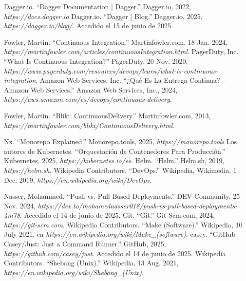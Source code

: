 
\begin{thebibliography}{99}
 Dagger.io. ``Dagger Documentation | Dagger.'' Dagger.io, 2022, {\it https://docs.dagger.io}
 Dagger.io. “Dagger | Blog.” Dagger.io, 2025, {\it https://dagger.io/blog/}. Accedido el 15 de junio de 2025

 Fowler, Martin. ``Continuous Integration.'' Martinfowler.com, 18 Jan. 2024, {\it https://martinfowler.com/articles/continuousIntegration.html}.
 PagerDuty, Inc. ``What Is Continuous Integration?'' PagerDuty, 20 Nov. 2020, {\it https://www.pagerduty.com/resources/devops/learn/what-is-continuous-integration}.
 Amazon Web Services, Inc. ``¿Qué Es La Entrega Continua? – Amazon Web Services.'' Amazon Web Services, Inc., 2024, {\it https://aws.amazon.com/es/devops/continuous-delivery}.

 Fowler, Martin. ``Bliki: ContinuousDelivery.'' Martinfowler.com, 2013, {\it https://martinfowler.com/bliki/ContinuousDelivery.html}.

 Nx. ``Monorepo Explained.'' Monorepo.tools, 2025, {\it https://monorepo.tools}
 Los autores de Kubernetes. ``Orquestación de Contenedores Para Producción.'' Kubernetes, 2025, {\it https://kubernetes.io/es}.
 Helm. ``Helm.'' Helm.sh, 2019, {\it https://helm.sh}.
 Wikipedia Contributors. ``DevOps.'' Wikipedia, Wikimedia, 1 Dec. 2019, {\it https://en.wikipedia.org/wiki/DevOps}.

 Nasser, Mohammed. ``Push vs. Pull-Based Deployments.'' DEV Community, 25 Nov. 2024, {\it https://dev.to/mohamednasser018/push-vs-pull-based-deployments-4m78}. Accedido el 14 de junio de 2025.
 Git. ``Git.'' Git-Scm.com, 2024, {\it https://git-scm.com}.
 Wikipedia Contributors. ``Make (Software).'' Wikipedia, 10 July 2021, en {\it https://en.wikipedia.org/wiki/Make\_(software)}.
 casey. ``GitHub - Casey/Just: Just a Command Runner.'' GitHub, 2025, {\it https://github.com/casey/just}. Accedido el 14 de junio de 2025.
 Wikipedia Contributors. ``Shebang (Unix).'' Wikipedia, 13 Aug. 2021, {\it https://en.wikipedia.org/wiki/Shebang\_(Unix)}.


\end{thebibliography}
